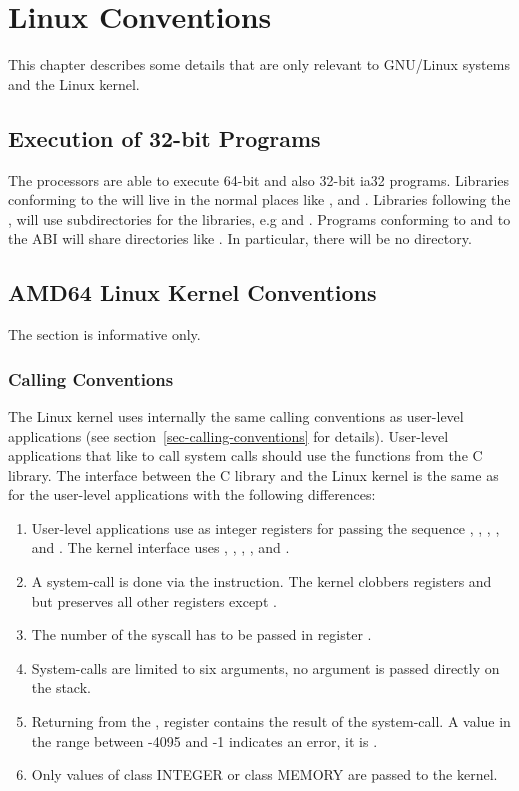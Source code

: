 \chapter{Linux Conventions}

This chapter describes some details that are only relevant to 
GNU/Linux systems and the Linux kernel.

\section{Execution of 32-bit Programs}


The \xARCH processors are able to execute 64-bit \xARCH and also
32-bit ia32 programs.  Libraries conforming to the \intelabi will live
in the normal places like ,  and
.  Libraries following the \xARCH, will use
 subdirectories for the libraries, e.g  and
.  Programs conforming to \intelabi and to the \xARCH
ABI will share directories like .  In particular, there
will be no  directory.

\section{AMD64 Linux Kernel Conventions}

The section is informative only.

\subsection{Calling Conventions}

The Linux \xARCH kernel uses internally the same calling conventions as user-level
applications (see section~\ref{sec-calling-conventions} for details).
User-level applications that like to call system calls should use the
functions from the C library.  The interface between the C library and
the Linux kernel is the same as for the user-level applications with
the following differences:
\begin{enumerate}
\item User-level applications use as integer registers for passing the
  sequence \RDI, \RSI, \RDX, \RCX,  and .  The kernel
  interface uses \RDI, \RSI, \RDX, ,  and .
\item A system-call is done via the  instruction.  The
  kernel clobbers registers \RCX and  but preserves all other
  registers except \RAX.
\item The number of the syscall has to be passed in register \RAX.
\item System-calls are limited to six arguments, no argument is passed
  directly on the stack.
\item Returning from the , register \RAX contains the
  result of the system-call.  A value in the range between -4095 and
  -1 indicates an error, it is .
\item Only values of class INTEGER or class MEMORY are passed to the
  kernel.
\end{enumerate}

